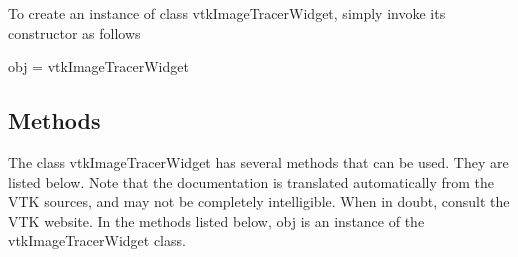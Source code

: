 To create an instance of class vtk\-Image\-Tracer\-Widget, simply invoke its constructor as follows \begin{DoxyVerb}  obj = vtkImageTracerWidget
\end{DoxyVerb}
 \hypertarget{vtkwidgets_vtkxyplotwidget_Methods}{}\subsection{Methods}\label{vtkwidgets_vtkxyplotwidget_Methods}
The class vtk\-Image\-Tracer\-Widget has several methods that can be used. They are listed below. Note that the documentation is translated automatically from the V\-T\-K sources, and may not be completely intelligible. When in doubt, consult the V\-T\-K website. In the methods listed below, {\ttfamily obj} is an instance of the vtk\-Image\-Tracer\-Widget class. 
